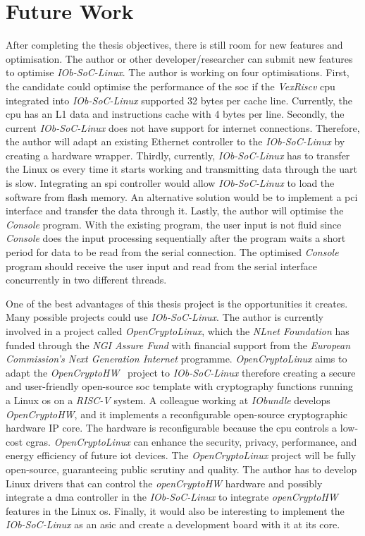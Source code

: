 \section{Future Work}
\label{section:future}
After completing the thesis objectives, there is still room for new features and optimisation. The author or other developer/researcher can submit new features to optimise \textit{IOb-SoC-Linux}. The author is working on four optimisations. First, the candidate could optimise the performance of the \acrshort{soc} if the \textit{VexRiscv} \acrshort{cpu} integrated into \textit{IOb-SoC-Linux} supported 32 bytes per cache line. Currently, the \acrshort{cpu} has an L1 data and instructions cache with 4 bytes per line. Secondly, the current \textit{IOb-SoC-Linux} does not have support for internet connections. Therefore, the author will adapt an existing Ethernet controller to the \textit{IOb-SoC-Linux} by creating a hardware wrapper. Thirdly, currently, \textit{IOb-SoC-Linux} has to transfer the Linux \acrshort{os} every time it starts working and transmitting data through the \acrshort{uart} is slow. Integrating an \acrfull{spi} controller would allow \textit{IOb-SoC-Linux} to load the software from flash memory. An alternative solution would be to implement a \acrshort{pci} interface and transfer the data through it. Lastly, the author will optimise the \textit{Console} program. With the existing program, the user input is not fluid since \textit{Console} does the input processing sequentially after the program waits a short period for data to be read from the serial connection. The optimised \textit{Console} program should receive the user input and read from the serial interface concurrently in two different threads.

One of the best advantages of this thesis project is the opportunities it creates. Many possible projects could use \textit{IOb-SoC-Linux}. The author is currently involved in a project called \textit{OpenCryptoLinux}, which the \textit{NLnet Foundation} has funded through the \textit{NGI Assure Fund} with financial support from the \textit{European Commission's Next Generation Internet} programme. \textit{OpenCryptoLinux} aims to adapt the \textit{OpenCryptoHW}~\cite{open_crypto_hw} project to \textit{IOb-SoC-Linux} therefore creating a secure and user-friendly open-source \acrshort{soc} template with cryptography functions running a Linux \acrshort{os} on a \textit{RISC-V} system. A colleague working at \textit{IObundle} develops \textit{OpenCryptoHW}, and it implements a reconfigurable open-source cryptographic hardware IP core. The hardware is reconfigurable because the \acrshort{cpu} controls a low-cost \acrfull{cgras}. \textit{OpenCryptoLinux} can enhance the security, privacy, performance, and energy efficiency of future \acrfull{iot} devices. The \textit{OpenCryptoLinux} project will be fully open-source, guaranteeing public scrutiny and quality. The author has to develop Linux drivers that can control the \textit{openCryptoHW} hardware and possibly integrate a \acrshort{dma} controller in the \textit{IOb-SoC-Linux} to integrate \textit{openCryptoHW} features in the Linux \acrshort{os}. Finally, it would also be interesting to implement the \textit{IOb-SoC-Linux} as an \acrshort{asic} and create a development board with it at its core.
